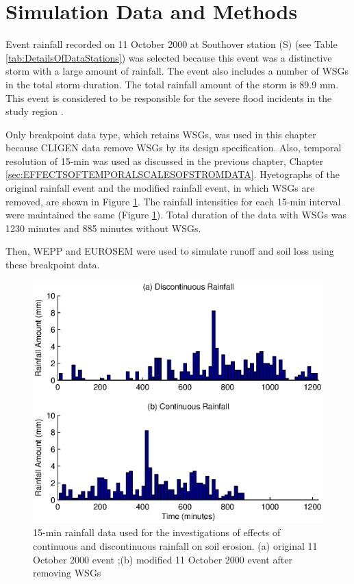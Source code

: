 \section{Simulation Data and Methods}
\label{sec:ContinousAndDiscontinousStormMethods}

Event rainfall recorded on 11 October 2000 at Southover station (S) (see Table
\ref{tab:DetailsOfDataStations}) was selected because this event was a
distinctive storm with a large amount of rainfall. The event also includes a
number of WSGs in the total storm duration. The total rainfall amount of the
storm is 89.9 mm. This event is considered to be responsible for the severe
flood incidents in the study region \citep{boardman2001-346}.

Only breakpoint data type, which retains WSGs, was used in this chapter because
CLIGEN data remove WSGs by its design specification. Also, temporal resolution of
15-min was used as discussed in the previous chapter, Chapter
\ref{sec:EFFECTSOFTEMPORALSCALESOFSTROMDATA}. Hyetographs of the original
rainfall event and the modified rainfall event, in which WSGs are removed, are
shown in Figure \ref{fig:rainfall_discont_cont}. The rainfall intensities for
each 15-min interval were maintained the same (Figure
\ref{fig:rainfall_discont_cont}). Total duration of the data with WSGs was 1230
minutes and 885 minutes without WSGs.

Then, WEPP and EUROSEM were used to simulate runoff and soil loss using these
breakpoint data.

\begin{figure}[tbp]
  \centering
    \includegraphics[width=1.0\textwidth]
{./img/rainfall_discont_cont_input}
  \caption[15-min rainfall data used for the investigations of effects of
continuous and discontinuous rainfall on soil erosion.]{15-min rainfall data
used for the investigations of effects of continuous and discontinuous rainfall
on soil erosion. (a) original 11 October 2000 event ;(b) modified 11 October
2000 event after removing WSGs}
  \label{fig:rainfall_discont_cont}
\end{figure}

